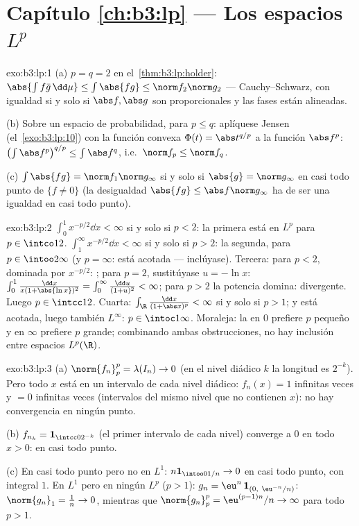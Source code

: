 \section*{Capítulo \ref{ch:b3:lp} --- Los espacios $L^p$}

\begin{solution}{exo:b3:lp:1}
(a) $p = q = 2$ en el~\cref{thm:b3:lp:holder}: $\abs{\int f\bar
g\,\dd\mu} \leq \int\abs{fg} \leq \norm f_2\norm g_2$ ---
Cauchy--Schwarz, con igualdad si y solo si $\abs f, \abs g$ son
proporcionales y las fases están alineadas.

(b) Sobre un espacio de probabilidad, para $p \leq q$: aplíquese Jensen
(el~\cref{exo:b3:lp:10}) con la función convexa $\Phi(t) =
\abs t^{q/p}$ a la función $\abs f^p$:
$\bigl(\int\abs f^p\bigr)^{q/p} \leq \int\abs f^q$, i.e.\
$\norm f_p \leq \norm f_q$.

(c) $\int\abs{fg} = \norm f_1\norm g_\infty$ si y solo si $\abs{g} =
\norm g_\infty$ en casi todo punto de $\{f \neq 0\}$ (la desigualdad
$\abs{fg} \leq \abs f\norm g_\infty$ ha de ser una igualdad en casi todo
punto).
\end{solution}

\begin{solution}{exo:b3:lp:2}
$\int_0^1 x^{-p/2}\dd x < \infty$ si y solo si $p < 2$: la primera está
en $L^p$ para $p \in \intco12$. $\int_1^\infty x^{-p/2}\dd x <
\infty$ si y solo si $p > 2$: la segunda, para $p \in \intoo2\infty$ (y
$p = \infty$: está acotada --- inclúyase). Tercera: para $p <
2$, dominada por $x^{-p/2}$: ;
para $p = 2$, sustitúyase $u = -\ln x$:
$\int_0^1\frac{\dd x}{x(1 + \abs{\ln
x})^2} = \int_0^\infty\frac{\dd u}{(1 + u)^2} < \infty$; para $p > 2$ la
potencia domina: divergente. Luego $p \in \intcc12$. Cuarta:
$\int_\R\frac{\dd x}{(1 + \abs x)^p} < \infty$ si y solo si $p >
1$; y está acotada, luego también $L^\infty$: $p \in
\intoc1\infty$. Moraleja: la 
en $0$ prefiere $p$ pequeño y en $\infty$ prefiere $p$ grande;
combinando ambas obstrucciones, no hay inclusión entre espacios
$L^p(\R)$.
\end{solution}

\begin{solution}{exo:b3:lp:3}
(a) $\norm{f_n}_p^p = \lambda(I_n) \to 0$ (en el nivel diádico $k$ la
longitud es $2^{-k}$). Pero todo $x$ está en un intervalo de cada nivel
diádico: $f_n(x) = 1$ infinitas veces y $= 0$ infinitas veces
(intervalos del mismo nivel que no contienen $x$): no hay convergencia
en ningún punto.

(b) $f_{n_k} = \mathbf 1_{\intcc0{2^{-k}}}$ (el primer intervalo de cada
nivel) converge a $0$ en todo $x > 0$: en casi todo punto.

(c) En casi todo punto pero no en $L^1$:
$n\mathbf 1_{\intoo0{1/n}} \to 0$ en casi todo punto, con integral $1$.
En $L^1$ pero en ningún $L^p$ ($p > 1$): $g_n =
\eu^n\,\mathbf 1_{(0,\ \eu^{-n}/n)}$: $\norm{g_n}_1 = \frac1n
\to 0$, mientras que $\norm{g_n}_p^p = \eu^{(p-1)n}/n \to \infty$ para
todo $p > 1$.
\end{solution}

